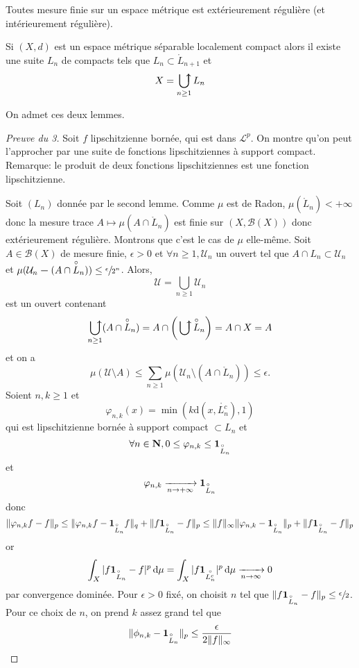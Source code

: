 \begin{lmm}
    Toutes mesure finie sur un espace métrique est extérieurement régulière (et intérieurement régulière).
\end{lmm}

\begin{lmm}
    Si $(X, d)$ est un espace métrique séparable localement compact alors il existe une suite  $L_n$ de compacts tels que  $L_n\subset \mathring L_{n+1}$ et \[
    X=\ubigcup_{n\geq 1}L_n
    \]
\end{lmm}

On admet ces deux lemmes.

\begin{proof}[Preuve du 3]
Soit $f$ lipschitzienne bornée, qui est dans  $\mathcal  L^p$. On montre qu'on peut l'approcher par une suite de fonctions lipschitziennes à support compact. Remarque: le produit de deux fonctions lipschitziennes est une fonction lipschitzienne.

Soit $(L_n)$ donnée par le second lemme. Comme  $\mu$ est de Radon,  $\mu(\mathring L_n)<+\infty$ donc la mesure trace $A\longmapsto \mu\left(A\cap \mathring L_n\right)$ est finie sur $(X, \mathcal  B(X))$ donc extérieurement régulière. Montrons que c'est le cas de $\mu$ elle-même. Soit  $A \in  \mathcal  B(X)$ de mesure finie, $ \epsilon>0$ et $\forall  n \geq 1, \mathcal  U_n$ un ouvert tel que $A\cap L_n\subset \mathcal  U_n$ et $\mu(\mathcal  U_n\bm-  (A\cap \overset\circ{L}_n))\leq \sfrac{\epsilon}{2^n}$. Alors, \[
\mathcal  U=\bigcup_{n\geq 1}\mathcal  U_n
\] 
est un ouvert contenant \[
    \ubigcup_{n\geq 1}(A\cap \mathring L_{n})=A\cap\left(\ubigcup \mathring L_n\right)=A\cap X=A
\]
et on a \[
    \mu(\mathcal  U \setminus  A)\leq \sum_{n\geq 1} \mu(\mathcal  U_n \setminus  (A \cap \mathring L_n))\leq \epsilon.
\]
Soient $n, k\geq 1$ et \[
    \varphi_{n, k}(x)=\min(k\mathrm d(x, \mathring {L_n^c}), 1)
\] 
qui est lipschitzienne bornée à support compact $\subset L_n$ et \[
    \forall  n \in  \mathbf N, 0\leq \varphi_{n, k}\leq \bm{1}_{\overset\circ{L}_n}
\] 
et \[
    \varphi_{n, k} \xrightarrow[n\to+\infty]{}\bm{1}_{\overset\circ{L}_n}
\] 
donc \[
\|{\varphi_{n,k}f}-f\|_p \leq \| \varphi_{n,k}f- \bm{1}_{\overset\circ{L}_n}f\|_q+ \| f\bm{1}_{\overset\circ{L}_n}-f\|_p\leq \|f\|_{\infty}\|\varphi_{n,k}-\bm{1}_{\overset\circ{L}_n}\|_{p} + \|f\bm{1}_{\overset\circ{L}_n}-f\|_p
\]
or \[
    \int_X |f\bm{1}_{\overset\circ{L}_n}-f|^p\mathop{}\!\mathrm d\mu = \int_X |f\bm{1}_{\overset\circ{L_n^c}}|^p\mathop{}\!\mathrm d\mu \xrightarrow[n\to\infty]{} 0
\]
par convergence dominée. Pour $ \epsilon>0$ fixé, on choisit $n$ tel que  $\|f\bm{1}_{\overset\circ{L}_n}-f\|_p\leq \sfrac\epsilon2$. Pour ce choix de $n$, on prend  $k$ assez grand tel que  \[
\|\phi_{n,k}-\bm{1}_{\overset\circ{L}_n}\|_p \leq \frac{\epsilon}{2\|f\|_{\infty}}
\] 
\end{proof}
